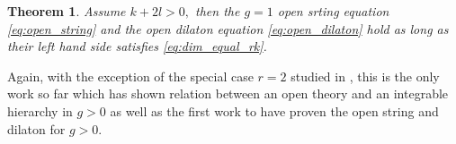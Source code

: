\documentclass[11pt]{amsart}
\newtheorem{thm}[dummy]{Theorem}
\theoremstyle{definition}
\theoremstyle{remark}
\newcommand{\<}{\left<}
\renewcommand{\>}{\right>}
\numberwithin{equation}{section}
\begin{document}
\begin{thm}\label{thm:open_string_dilaton}
Assume $k+2l>0,$ then the %
$g=1$ open srting equation %
\eqref{eq:open_string} and %
the open dilaton equation %
\eqref{eq:open_dilaton} hold as long as their left hand side satisfies \eqref{eq:dim_equal_rk}.
\end{thm}
Again, with the exception of the special case $r=2$ studied %
in \cite{Tes2,BT17}, this %
is the only work so far which has shown relation between an open theory and an integrable hierarchy %
in $g>0$ as %
well as the first work to have proven the open string and dilaton for $g>0.$
\end{document}
